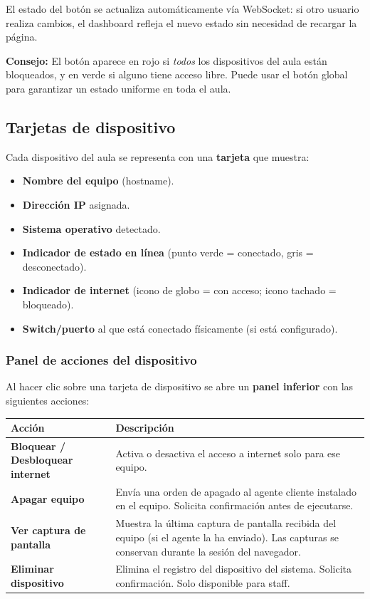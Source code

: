 \documentclass[12pt,a4paper]{article}
\begin{document}
El estado del botón se actualiza automáticamente vía WebSocket: si otro usuario realiza cambios, el dashboard refleja el nuevo estado sin necesidad de recargar la página.

\begin{tipnote}
\textbf{Consejo:} El botón aparece en rojo si \textit{todos} los dispositivos del aula están bloqueados, y en verde si alguno tiene acceso libre. Puede usar el botón global para garantizar un estado uniforme en toda el aula.
\end{tipnote}

\subsection{Tarjetas de dispositivo}

Cada dispositivo del aula se representa con una \textbf{tarjeta} que muestra:

\begin{itemize}
    \item \textbf{Nombre del equipo} (hostname).
    \item \textbf{Dirección IP} asignada.
    \item \textbf{Sistema operativo} detectado.
    \item \textbf{Indicador de estado en línea} (punto verde = conectado, gris = desconectado).
    \item \textbf{Indicador de internet} (icono de globo = con acceso; icono tachado = bloqueado).
    \item \textbf{Switch/puerto} al que está conectado físicamente (si está configurado).
\end{itemize}

\subsubsection{Panel de acciones del dispositivo}

Al hacer clic sobre una tarjeta de dispositivo se abre un \textbf{panel inferior} con las siguientes acciones:

\begin{table}[H]
\centering
\begin{tabularx}{\textwidth}{lX}
    \toprule
    \textbf{Acción} & \textbf{Descripción} \\
    \midrule
    \textbf{Bloquear / Desbloquear internet} & Activa o desactiva el acceso a internet solo para ese equipo. \\
    \textbf{Apagar equipo} & Envía una orden de apagado al agente cliente instalado en el equipo. Solicita confirmación antes de ejecutarse. \\
    \textbf{Ver captura de pantalla} & Muestra la última captura de pantalla recibida del equipo (si el agente la ha enviado). Las capturas se conservan durante la sesión del navegador. \\
    \textbf{Eliminar dispositivo} & Elimina el registro del dispositivo del sistema. Solicita confirmación. Solo disponible para staff. \\
    \bottomrule
\end{tabularx}
\end{table}
\end{document}

